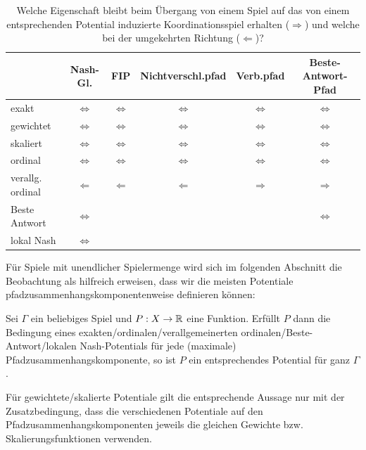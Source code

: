 \begin{table}[h]\centering
	\begin{tabular}{l|ccccc}
						& Nash-Gl. 			& FIP 					& Nichtverschl.pfad 			& Verb.pfad 		& Beste-Antwort-Pfad \\\hline
		exakt			& $\Leftrightarrow$	& $\Leftrightarrow$ 	& $\Leftrightarrow$				& $\Leftrightarrow$	& $\Leftrightarrow$ \\
		gewichtet		& $\Leftrightarrow$	& $\Leftrightarrow$ 	& $\Leftrightarrow$				& $\Leftrightarrow$	& $\Leftrightarrow$ \\		
		skaliert		& $\Leftrightarrow$ & $\Leftrightarrow$ 	& $\Leftrightarrow$				& $\Leftrightarrow$	& $\Leftrightarrow$ \\
		ordinal			& $\Leftrightarrow$	& $\Leftrightarrow$ 	& $\Leftrightarrow$				& $\Leftrightarrow$	& $\Leftrightarrow$ \\
		verallg. ordinal& $\Leftarrow$		& $\Leftarrow$		 	& $\Leftarrow$					& $\Rightarrow$		& $\Rightarrow$ 	\\
		Beste Antwort	& $\Leftrightarrow$	& 					 	& 								& 					& $\Leftrightarrow$ \\
		lokal Nash		& $\Leftrightarrow$	& 					 	& 								& 					& 					
	\end{tabular}	
	\caption{Welche Eigenschaft bleibt beim Übergang von einem Spiel auf das von einem entsprechenden Potential induzierte Koordinationsspiel erhalten ($\Rightarrow$) und welche bei der umgekehrten Richtung ($\Leftarrow$)?}\label{tab:PotErhalten}
\end{table}

Für Spiele mit unendlicher Spielermenge wird sich im folgenden Abschnitt die Beobachtung als hilfreich erweisen, dass wir die meisten Potentiale pfadzusammenhangskomponentenweise definieren können:

\begin{beob}\label{beob:KompWeisePotentiale}
	Sei $\Gamma$ ein beliebiges Spiel und $P: X \to \mathbb{R}$ eine Funktion. Erfüllt $P$ dann die Bedingung eines exakten/ordinalen/verallgemeinerten ordinalen/Beste-Antwort/lokalen Nash-Potentials für jede (maximale) Pfadzusammenhangskomponente, so ist $P$ ein entsprechendes Potential für ganz $\Gamma$.
	
	Für gewichtete/skalierte Potentiale gilt die entsprechende Aussage nur mit der Zusatzbedingung, dass die verschiedenen Potentiale auf den Pfadzusammenhangskomponenten jeweils die gleichen Gewichte bzw. Skalierungsfunktionen verwenden.
\end{beob}

